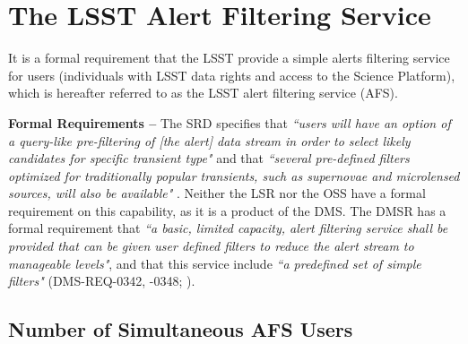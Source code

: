 \documentclass[DM,authoryear,toc]{lsstdoc}
\begin{document}


\section{The LSST Alert Filtering Service} \label{sec:LAFS}

It is a formal requirement that the LSST provide a simple alerts filtering service for users (individuals with LSST data rights and access to the Science Platform), which is hereafter referred to as the LSST alert filtering service (AFS).

{\bf Formal Requirements --} The SRD specifies that {\it ``users will have an option of a query-like pre-filtering of [the alert] data stream in order to select likely candidates for specific transient type"} and that {\it ``several pre-defined filters optimized for traditionally popular transients, such as supernovae and microlensed sources, will also be available"} . Neither the LSR nor the OSS have a formal requirement on this capability, as it is a product of the DMS. The DMSR has a formal requirement that {\it ``a basic, limited capacity, alert filtering service shall be provided that can be given user defined filters to reduce the alert stream to manageable levels"}, and that this service include {\it ``a predefined set of simple filters"} (DMS-REQ-0342, -0348; ). 


\subsection{Number of Simultaneous AFS Users}\label{ssec:AFS_users}
\end{document}
